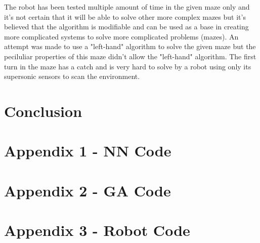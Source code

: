 \documentclass[12pt]{report}
\newenvironment{longlisting}{\captionsetup{type=listing}}{}
\begin{document}
The robot has been tested multiple amount of time in the given maze only and it's not certain that it will be able to solve other more complex mazes but it's believed that the algorithm is modifiable and can be used as a base in creating more
complicated systems to solve more complicated problems (mazes). An attempt was made to use a "left-hand" algorithm to solve the given maze but the peciluliar properties of this maze didn't allow the "left-hand" algorithm. The first turn in the maze
has a catch and is very hard to solve by a robot using only its supersonic sensors to scan the environment.
\clearpage

\section*{Conclusion}


\clearpage


\section*{Appendix 1 - NN Code}
\paragraph{}


\clearpage

\section*{Appendix 2 - GA Code}
\paragraph{}


\clearpage

\section*{Appendix 3 - Robot Code}
\paragraph{}

\begin{longlisting}
\inputminted[linenos,breaklines]{lua}{code/leftHand.lua}
\end{longlisting}

\clearpage

{}

\end{document}
